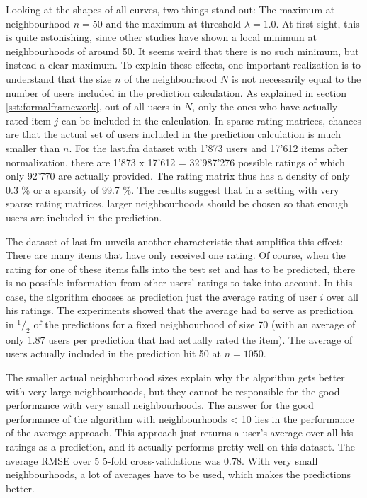 Looking at the shapes of all curves, two things stand out: The maximum at neighbourhood $n=50$ and the maximum at threshold $\lambda = 1.0$. At first sight, this is quite astonishing, since other studies have shown a local minimum at neighbourhoods of around 50. It seems weird that there is no such minimum, but instead a clear maximum. To explain these effects, one important realization is to understand that the size $n$ of the neighbourhood $N$ is not necessarily equal to the number of users included in the prediction calculation. As explained in section \ref{sst:formalframework}, out of all users in $N$, only the ones who have actually rated item $j$ can be included in the calculation. In sparse rating matrices, chances are that the actual set of users included in the prediction calculation is much smaller than $n$. For the last.fm dataset with 1'873 users and 17'612 items after normalization, there are 1'873 x 17'612 = 32'987'276 possible ratings of which only 92'770 are actually provided. The rating matrix thus has a density of only 0.3 \% or a sparsity of 99.7 \%. The results suggest that in a setting with very sparse rating matrices, larger neighbourhoods should be chosen so that enough users are included in the prediction.

The dataset of last.fm unveils another characteristic that amplifies this effect: There are many items that have only received one rating. Of course, when the rating for one of these items falls into the test set and has to be predicted, there is no possible information from other users' ratings to take into account. In this case, the algorithm chooses as prediction just the average rating of user $i$ over all his ratings. The experiments showed that the average had to serve as prediction in ${}^1/_2$ of the predictions for a fixed neighbourhood of size 70 (with an average of only 1.87 users per prediction that had actually rated the item). The average of users actually included in the prediction hit 50 at $n = 1050$.

The smaller actual neighbourhood sizes explain why the algorithm gets better with very large neighbourhoods, but they cannot be responsible for the good performance with very small neighbourhoods. The answer for the good performance of the algorithm with neighbourhoods < 10 lies in the performance of the average approach. This approach just returns a user's average over all his ratings as a prediction, and it actually performs pretty well on this dataset. The average RMSE over 5 5-fold cross-validations was 0.78. With very small neighbourhoods, a lot of averages have to be used, which makes the predictions better.

